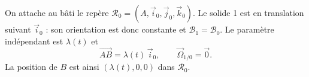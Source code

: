 \begin{corrigebox}
On attache au bâti le repère $\mathcal R_0=(A,\vec i_0,\vec j_0,\vec k_0)$.
Le solide 1 est en translation suivant $\vec i_0$ : son orientation est donc
constante et $\mathcal B_1=\mathcal B_0$. Le paramètre indépendant est
$\lambda(t)$ et
\[
  \overrightarrow{AB}=\lambda(t)\,\vec i_0,\qquad
  \vec\Omega_{1/0}=\vec 0.
\]
La position de $B$ est ainsi $(\lambda(t),0,0)$ dans $\mathcal R_0$.
\end{corrigebox}
